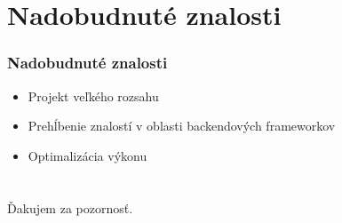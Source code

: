 \documentclass[pdf]{beamer}
\begin{document}
\section{Nadobudnuté znalosti}
\begin{frame}
    \frametitle{Nadobudnuté znalosti}
    \begin{itemize}
        \setlength\itemsep{1em}
        \item Projekt veľkého rozsahu
        \item Prehĺbenie znalostí v oblasti backendových frameworkov
        \item Optimalizácia výkonu
    \end{itemize}
\end{frame}

\section*{}
\begin{frame}{}
    Ďakujem za pozornosť.
\end{frame}
\end{document}
